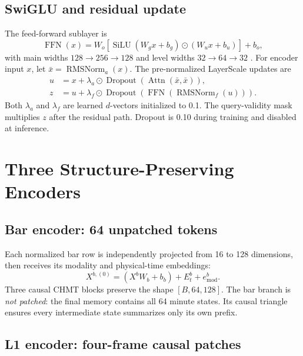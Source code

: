 \documentclass[10pt,letterpaper]{article}
\numberwithin{equation}{section}
\newcommand{\SiLU}{\operatorname{SiLU}}
\newcommand{\RMSNorm}{\operatorname{RMSNorm}}
\newcommand{\FFN}{\operatorname{FFN}}
\newcommand{\Attn}{\operatorname{Attn}}
\theoremstyle{definition}
\theoremstyle{remark}
\begin{document}
\subsection{SwiGLU and residual update}

The feed-forward sublayer is
\begin{equation}
\FFN(x)=W_o\!\left[
\SiLU(W_gx+b_g)\odot(W_ux+b_u)
\right]+b_o,
\label{eq:swiglu}
\end{equation}
with main widths $128\rightarrow256\rightarrow128$ and level widths
$32\rightarrow64\rightarrow32$ \citep{shazeer2020}. For encoder input $x$,
let $\bar x=\RMSNorm_a(x)$. The pre-normalized LayerScale updates are
\begin{align}
u&=x+\lambda_a\odot
\operatorname{Dropout}(\Attn(\bar x,\bar x)),\nonumber\\
z&=u+\lambda_f\odot
\operatorname{Dropout}(\FFN(\RMSNorm_f(u))).
\label{eq:encoder-residual}
\end{align}
Both $\lambda_a$ and $\lambda_f$ are learned $d$-vectors initialized to 0.1.
The query-validity mask multiplies $z$ after the residual path. Dropout is 0.10
during training and disabled at inference.

\section{Three Structure-Preserving Encoders}

\subsection{Bar encoder: 64 unpatched tokens}

Each normalized bar row is independently projected from 16 to 128 dimensions,
then receives its modality and physical-time embeddings:
\begin{equation}
X^{b,(0)}=(X^bW_b+b_b)+E_t^b+e^b_{\mathrm{mod}}.
\label{eq:bar-embedding}
\end{equation}
Three causal CHMT blocks preserve the shape $[B,64,128]$. The bar branch is
\emph{not patched}: the final memory contains all 64 minute states. Its causal
triangle ensures every intermediate state summarizes only its own prefix.

\subsection{L1 encoder: four-frame causal patches}
\end{document}
